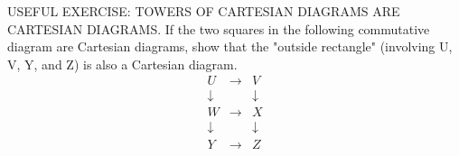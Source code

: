 USEFUL EXERCISE: TOWERS OF CARTESIAN DIAGRAMS ARE CARTESIAN DIAGRAMS. If the two squares in the following commutative diagram are Cartesian diagrams, show that the "outside rectangle" (involving U, V, Y, and Z) is also a Cartesian diagram.
$$\begin{array}{ccc} U &\longrightarrow& V \\ \downarrow && \downarrow \\ W &\longrightarrow& X \\ \downarrow && \downarrow \\ Y &\longrightarrow& Z \end{array}$$
